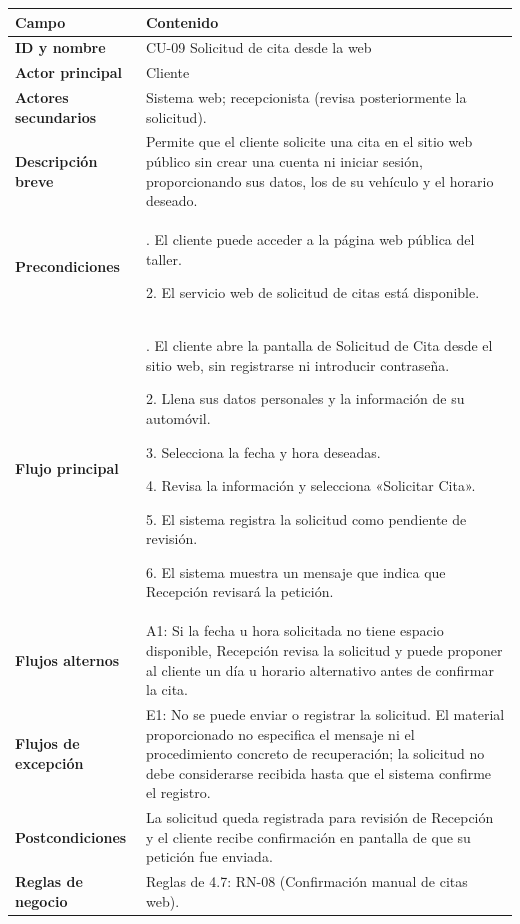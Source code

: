 {\def\LTcaptype{none} %
\begin{longtable}[]{@{}
  >{\raggedright\arraybackslash}p{}
  >{\raggedright\arraybackslash}p{}@{}}
\toprule\noalign{}
\begin{minipage}[b]{\linewidth}\raggedright
\textbf{Campo}
\end{minipage} & \begin{minipage}[b]{\linewidth}\raggedright
\textbf{Contenido}
\end{minipage} \\
\midrule\noalign{}
\endhead
\bottomrule\noalign{}
\endlastfoot
\textbf{ID y nombre} & CU-09 Solicitud de cita desde la web \\
\textbf{Actor principal} & Cliente \\
\textbf{Actores secundarios} & Sistema web; recepcionista (revisa
posteriormente la solicitud). \\
\textbf{Descripción breve} & Permite que el cliente solicite una cita en
el sitio web público sin crear una cuenta ni iniciar sesión,
proporcionando sus datos, los de su vehículo y el horario deseado. \\
\textbf{Precondiciones} & 1. El cliente puede acceder a la página web
pública del taller.

2. El servicio web de solicitud de citas está disponible. \\
\textbf{Flujo principal} & 1. El cliente abre la pantalla de Solicitud
de Cita desde el sitio web, sin registrarse ni introducir contraseña.

2. Llena sus datos personales y la información de su automóvil.

3. Selecciona la fecha y hora deseadas.

4. Revisa la información y selecciona «Solicitar Cita».

5. El sistema registra la solicitud como pendiente de revisión.

6. El sistema muestra un mensaje que indica que Recepción revisará la
petición. \\
\textbf{Flujos alternos} & A1: Si la fecha u hora solicitada no tiene
espacio disponible, Recepción revisa la solicitud y puede proponer al
cliente un día u horario alternativo antes de confirmar la cita. \\
\textbf{Flujos de excepción} & E1: No se puede enviar o registrar la
solicitud. El material proporcionado no especifica el mensaje ni el
procedimiento concreto de recuperación; la solicitud no debe
considerarse recibida hasta que el sistema confirme el registro. \\
\textbf{Postcondiciones} & La solicitud queda registrada para revisión
de Recepción y el cliente recibe confirmación en pantalla de que su
petición fue enviada. \\
\textbf{Reglas de negocio} & Reglas de 4.7: RN-08 (Confirmación manual
de citas web).


\end{longtable}}
